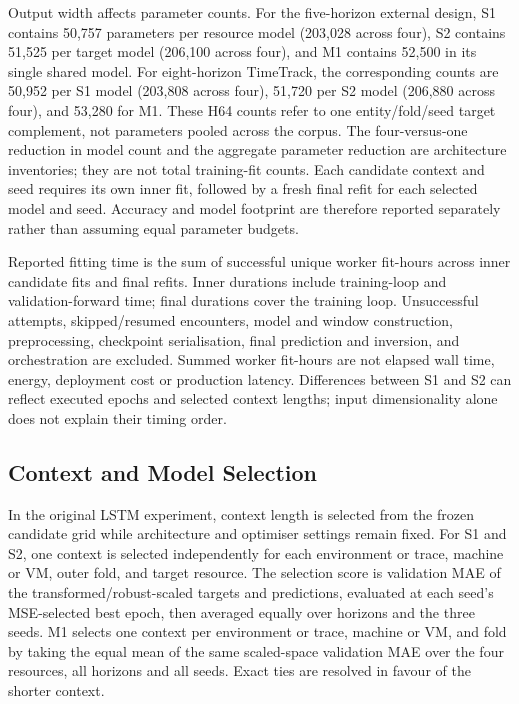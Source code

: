 \documentclass[a4paper,fleqn]{cas-dc}
\begin{document}
Output width affects parameter counts.  For the five-horizon external design,
S1 contains 50,757 parameters per resource model (203,028 across four), S2
contains 51,525 per target model (206,100 across four), and M1 contains 52,500
in its single shared model.  For eight-horizon TimeTrack, the corresponding
counts are 50,952 per S1 model (203,808 across four), 51,720 per S2 model
(206,880 across four), and 53,280 for M1. These H64 counts refer to one
entity/fold/seed target complement, not parameters pooled across the corpus.
The four-versus-one reduction in model count and the aggregate parameter
reduction are architecture inventories; they are not total training-fit
counts. Each candidate context and seed requires its own inner fit, followed
by a fresh final refit for each selected model and seed. Accuracy and model
footprint are therefore reported separately rather than assuming equal
parameter budgets.

Reported fitting time is the sum of successful unique worker fit-hours across
inner candidate fits and final refits. Inner durations include training-loop
and validation-forward time; final durations cover the training loop.
Unsuccessful attempts, skipped/resumed encounters, model and window
construction, preprocessing, checkpoint serialisation, final prediction and
inversion, and orchestration are excluded. Summed worker fit-hours are not
elapsed wall time, energy, deployment cost or production latency. Differences
between S1 and S2 can reflect executed epochs and selected context lengths;
input dimensionality alone does not explain their timing order.

\subsection{Context and Model Selection}
\label{sec:model-selection}

In the original LSTM experiment, context length is selected from the frozen
candidate grid while architecture and optimiser settings remain fixed.
For S1 and S2, one context
is selected independently for each environment or trace, machine or VM, outer
fold, and target resource. The selection score is validation MAE of the
transformed/robust-scaled targets and predictions, evaluated at each seed's
MSE-selected best epoch, then averaged equally over horizons and the three
seeds. M1 selects one context per environment or trace, machine or VM, and
fold by taking the equal mean of the same scaled-space validation MAE over
the four resources, all horizons and all seeds. Exact ties are resolved
in favour of the shorter context.
\end{document}
